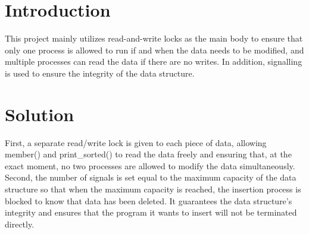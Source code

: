 \section{Introduction}
\label{chap:introduction}

This project mainly utilizes read-and-write locks as the main body to ensure that only one process is allowed to run
if and when the data needs to be modified, and multiple processes can read the data if there are no writes.
In addition, signalling is used to ensure the integrity of the data structure.

\section{Solution}
\label{chap:solution}
First, a separate read/write lock is given to each piece of data, allowing member() and print\_sorted() to read the data
freely and ensuring that, at the exact moment, no two processes are allowed to modify the data simultaneously. \vspace{8pt}\\
Second, the number of signals is set equal to the maximum capacity of the data structure so that when the maximum
capacity is reached, the insertion process is blocked to know that data has been deleted. It guarantees the data
structure's integrity and ensures that the program it wants to insert will not be terminated directly.

